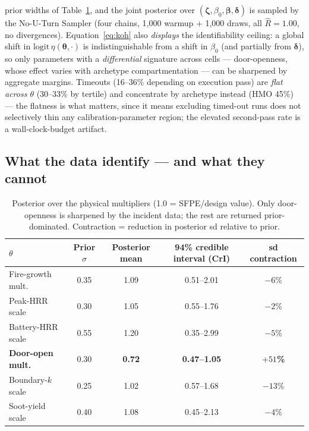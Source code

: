 \documentclass[11pt]{article}
\begin{document}
prior widths of Table~\ref{tab:theta}, and the joint posterior over
$(\boldsymbol\zeta, \beta_0, \boldsymbol\beta, \boldsymbol\delta)$ is sampled
by the No-U-Turn Sampler (four chains, 1{,}000 warmup + 1{,}000 draws, all
$\hat{R}=1.00$, no divergences). Equation~\eqref{eq:koh} also \emph{displays}
the identifiability ceiling: a global shift in
$\mathrm{logit}\,\eta(\boldsymbol\theta,\cdot)$ is indistinguishable from a
shift in $\beta_0$ (and partially from $\boldsymbol\delta$), so only parameters
with a \emph{differential} signature across cells --- door-openness, whose
effect varies with archetype compartmentation --- can be sharpened by aggregate
margins.
Timeouts (16--36\% depending on execution pass) are \emph{flat across
$\theta$} (30--33\% by tertile) and concentrate by archetype instead (HMO 45\%)
--- the flatness is what matters, since it means excluding timed-out runs does
not selectively thin any calibration-parameter region; the elevated second-pass
rate is a wall-clock-budget artifact.

\subsection{What the data identify --- and what they cannot}
\label{sec:calibration:identify}

\begin{table}[htbp]
  \centering
  \caption{Posterior over the physical multipliers (1.0 = SFPE/design value).
  Only door-openness is sharpened by the incident data; the rest are returned
  prior-dominated. Contraction = reduction in posterior sd relative to prior.}
  \label{tab:theta}
  \small
  \begin{tabular}{@{}lcccc@{}}
    \toprule
    $\theta$ & Prior $\sigma$ & Posterior mean & 94\% credible interval (CrI) & sd contraction \\
    \midrule
    Fire-growth mult.      & 0.35 & 1.09 & 0.51--2.01 & $-6$\% \\
    Peak-HRR scale         & 0.30 & 1.05 & 0.55--1.76 & $-2$\% \\
    Battery-HRR scale      & 0.55 & 1.20 & 0.35--2.99 & $-5$\% \\
    \textbf{Door-open mult.} & 0.30 & \textbf{0.72} & \textbf{0.47--1.05} & \textbf{$+51$\%} \\
    Boundary-$k$ scale     & 0.25 & 1.02 & 0.57--1.68 & $-13$\% \\
    Soot-yield scale       & 0.40 & 1.08 & 0.45--2.13 & $-4$\% \\
    \bottomrule
  \end{tabular}
\end{table}
\end{document}
